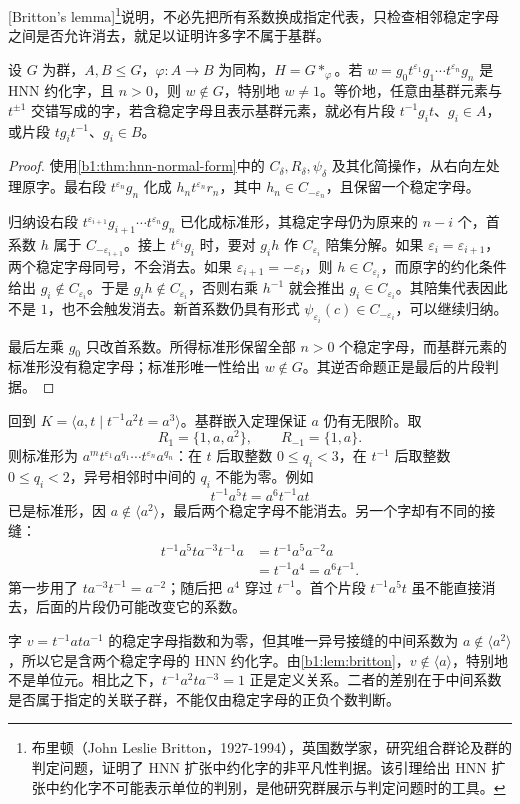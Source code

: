 [Britton's lemma]\footnote{布里顿（John Leslie Britton，1927-1994），英国数学家，研究组合群论及群的判定问题，证明了 HNN 扩张中约化字的非平凡性判据。该引理给出 HNN 扩张中约化字不可能表示单位的判别，是他研究群展示与判定问题时的工具。}说明，不必先把所有系数换成指定代表，只检查相邻稳定字母之间是否允许消去，就足以证明许多字不属于基群。

\begin{lemma}[Britton]\label{b1:lem:britton}
	设 \(G\) 为群，\(A,B\le G\)，\(\varphi:A\rightarrow B\) 为同构，\(H=G*_{\varphi}\)。若 \(w=g_0t^{\varepsilon_1}g_1\cdots t^{\varepsilon_n}g_n\) 是 HNN 约化字，且 \(n>0\)，则 \(w\notin G\)，特别地 \(w\ne1\)。等价地，任意由基群元素与 \(t^{\pm1}\) 交错写成的字，若含稳定字母且表示基群元素，就必有片段 \(t^{-1}g_it\)、\(g_i\in A\)，或片段 \(tg_it^{-1}\)、\(g_i\in B\)。
\end{lemma}
\begin{proof}
	使用\cref{b1:thm:hnn-normal-form}中的 \(C_\delta,R_\delta,\psi_\delta\) 及其化简操作，从右向左处理原字。最右段 \(t^{\varepsilon_n}g_n\) 化成 \(h_nt^{\varepsilon_n}r_n\)，其中 \(h_n\in C_{-\varepsilon_n}\)，且保留一个稳定字母。

	归纳设右段 \(t^{\varepsilon_{i+1}}g_{i+1}\cdots t^{\varepsilon_n}g_n\) 已化成标准形，其稳定字母仍为原来的 \(n-i\) 个，首系数 \(h\) 属于 \(C_{-\varepsilon_{i+1}}\)。接上 \(t^{\varepsilon_i}g_i\) 时，要对 \(g_ih\) 作 \(C_{\varepsilon_i}\) 陪集分解。如果 \(\varepsilon_i=\varepsilon_{i+1}\)，两个稳定字母同号，不会消去。如果 \(\varepsilon_{i+1}=-\varepsilon_i\)，则 \(h\in C_{\varepsilon_i}\)，而原字的约化条件给出 \(g_i\notin C_{\varepsilon_i}\)。于是 \(g_ih\notin C_{\varepsilon_i}\)，否则右乘 \(h^{-1}\) 就会推出 \(g_i\in C_{\varepsilon_i}\)。其陪集代表因此不是 \(1\)，也不会触发消去。新首系数仍具有形式 \(\psi_{\varepsilon_i}(c)\in C_{-\varepsilon_i}\)，可以继续归纳。

	最后左乘 \(g_0\) 只改首系数。所得标准形保留全部 \(n>0\) 个稳定字母，而基群元素的标准形没有稳定字母；标准形唯一性给出 \(w\notin G\)。其逆否命题正是最后的片段判据。
\end{proof}

回到 \(K=\langle a,t\mid t^{-1}a^2t=a^3\rangle\)。基群嵌入定理保证 \(a\) 仍有无限阶。取
\[
	R_1=\{1,a,a^2\},\qquad R_{-1}=\{1,a\}.
\]
则标准形为 \(a^m t^{\varepsilon_1}a^{q_1}\cdots t^{\varepsilon_n}a^{q_n}\)：在 \(t\) 后取整数 \(0\le q_i<3\)，在 \(t^{-1}\) 后取整数 \(0\le q_i<2\)，异号相邻时中间的 \(q_i\) 不能为零。例如
\[
	t^{-1}a^5t=a^6t^{-1}at
\]
已是标准形，因 \(a\notin\langle a^2\rangle\)，最后两个稳定字母不能消去。另一个字却有不同的接缝：
\[
	\begin{aligned}
		t^{-1}a^5t a^{-3}t^{-1}a
		&=t^{-1}a^5a^{-2}a\\
		&=t^{-1}a^4=a^6t^{-1}.
	\end{aligned}
\]
第一步用了 \(ta^{-3}t^{-1}=a^{-2}\)；随后把 \(a^4\) 穿过 \(t^{-1}\)。首个片段 \(t^{-1}a^5t\) 虽不能直接消去，后面的片段仍可能改变它的系数。

\ProseParagraphBreak
字 \(v=t^{-1}at a^{-1}\) 的稳定字母指数和为零，但其唯一异号接缝的中间系数为 \(a\notin\langle a^2\rangle\)，所以它是含两个稳定字母的 HNN 约化字。由\cref{b1:lem:britton}，\(v\notin\langle a\rangle\)，特别地不是单位元。相比之下，\(t^{-1}a^2t a^{-3}=1\) 正是定义关系。二者的差别在于中间系数是否属于指定的关联子群，不能仅由稳定字母的正负个数判断。
